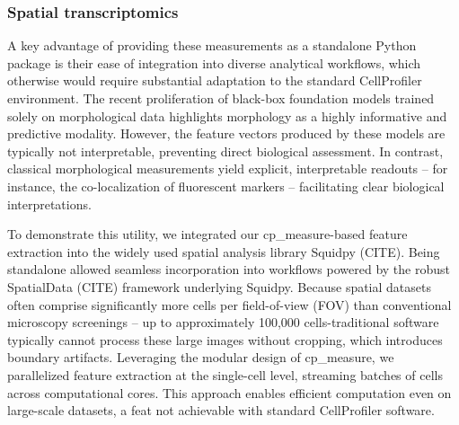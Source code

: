 \documentclass{article}
\begin{document}
\subsubsection{Spatial transcriptomics}
\label{sec:org5711d86}
A key advantage of providing these measurements as a standalone Python package is their ease of integration into diverse analytical workflows, which otherwise would require substantial adaptation to the standard CellProfiler environment. The recent proliferation of black-box foundation models trained solely on morphological data highlights morphology as a highly informative and predictive modality. However, the feature vectors produced by these models are typically not interpretable, preventing direct biological assessment. In contrast, classical morphological measurements yield explicit, interpretable readouts -- for instance, the co-localization of fluorescent markers -- facilitating clear biological interpretations.

To demonstrate this utility, we integrated our cp\_measure-based feature extraction into the widely used spatial analysis library Squidpy (CITE). Being standalone allowed seamless incorporation into workflows powered by the robust SpatialData (CITE) framework underlying Squidpy. Because spatial datasets often comprise significantly more cells per field-of-view (FOV) than conventional microscopy screenings -- up to approximately 100,000 cells-traditional software typically cannot process these large images without cropping, which introduces boundary artifacts. Leveraging the modular design of cp\_measure, we parallelized feature extraction at the single-cell level, streaming batches of cells across computational cores. This approach enables efficient computation even on large-scale datasets, a feat not achievable with standard CellProfiler software.
\end{document}
